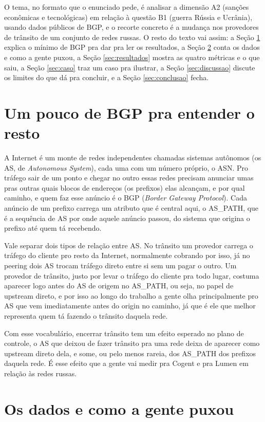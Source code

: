 \documentclass[12pt]{article}
\begin{document}
O tema, no formato que o enunciado pede, é analisar a dimensão A2 (sanções econômicas e tecnológicas) em relação à questão B1 (guerra Rússia e Ucrânia), usando dados públicos de BGP, e o recorte concreto é a mudança nos provedores de trânsito de um conjunto de redes russas. O resto do texto vai assim: a Seção \ref{sec:bgp} explica o mínimo de BGP pra dar pra ler os resultados, a Seção \ref{sec:dados} conta os dados e como a gente puxou, a Seção \ref{sec:resultados} mostra as quatro métricas e o que saiu, a Seção \ref{sec:caso} traz um caso pra ilustrar, a Seção \ref{sec:discussao} discute os limites do que dá pra concluir, e a Seção \ref{sec:conclusao} fecha.

\section{Um pouco de BGP pra entender o resto}
\label{sec:bgp}

A Internet é um monte de redes independentes chamadas sistemas autônomos (os AS, de \emph{Autonomous System}), cada uma com um número próprio, o ASN. Pro tráfego sair de um ponto e chegar no outro essas redes precisam anunciar umas pras outras quais blocos de endereços (os prefixos) elas alcançam, e por qual caminho, e quem faz esse anúncio é o BGP (\emph{Border Gateway Protocol}). Cada anúncio de um prefixo carrega um atributo que é central aqui, o AS\_PATH, que é a sequência de AS por onde aquele anúncio passou, do sistema que origina o prefixo até quem tá recebendo.

Vale separar dois tipos de relação entre AS. No trânsito um provedor carrega o tráfego do cliente pro resto da Internet, normalmente cobrando por isso, já no peering dois AS trocam tráfego direto entre si sem um pagar o outro. Um provedor de trânsito, justo por levar o tráfego do cliente pra todo lugar, costuma aparecer logo antes do AS de origem no AS\_PATH, ou seja, no papel de upstream direto, e por isso ao longo do trabalho a gente olha principalmente pro AS que vem imediatamente antes do origin no caminho, já que é ele que melhor representa quem tá fazendo o trânsito daquela rede.

Com esse vocabulário, encerrar trânsito tem um efeito esperado no plano de controle, o AS que deixou de fazer trânsito pra uma rede deixa de aparecer como upstream direto dela, e some, ou pelo menos rareia, dos AS\_PATH dos prefixos daquela rede. É esse efeito que a gente vai medir pra Cogent e pra Lumen em relação às redes russas.

\section{Os dados e como a gente puxou}
\label{sec:dados}
\end{document}
